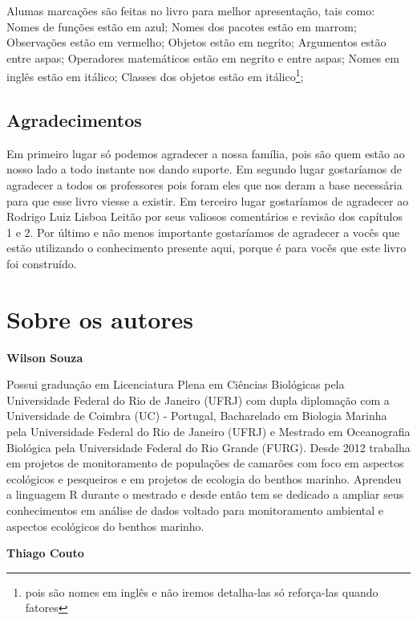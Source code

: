 \documentclass[14pt,titlepage, oneside, openany, a4paper]{book}
\begin{document}
Alumas marcações são feitas no livro para melhor apresentação, tais como: Nomes de funções estão em azul; Nomes dos pacotes estão em marrom; Observações estão em vermelho; Objetos estão em negrito; Argumentos estão entre aspas; Operadores matemáticos estão em negrito e entre aspas; Nomes em inglês estão em itálico; Classes dos objetos estão em itálico\footnote{pois são nomes em inglês e não iremos detalha-las só reforça-las quando fatores};

\hypertarget{agradecimentos}{%
\section*{Agradecimentos}\label{agradecimentos}}

Em primeiro lugar só podemos agradecer a nossa família, pois são quem estão ao nosso lado a todo instante nos dando suporte. Em segundo lugar gostaríamos de agradecer a todos os professores pois foram eles que nos deram a base necessária para que esse livro viesse a existir. Em terceiro lugar gostaríamos de agradecer ao Rodrigo Luiz Lisboa Leitão por seus valiosos comentários e revisão dos capítulos 1 e 2. Por último e não menos importante gostaríamos de agradecer a vocês que estão utilizando o conhecimento presente aqui, porque é para vocês que este livro foi construído.

\hypertarget{sobre-os-autores}{%
\chapter*{Sobre os autores}\label{sobre-os-autores}}

\textbf{Wilson Souza}

Possui graduação em Licenciatura Plena em Ciências Biológicas pela Universidade Federal do Rio de Janeiro (UFRJ) com dupla diplomação com a Universidade de Coimbra (UC) - Portugal, Bacharelado em Biologia Marinha pela Universidade Federal do Rio de Janeiro (UFRJ) e Mestrado em Oceanografia Biológica pela Universidade Federal do Rio Grande (FURG). Desde 2012 trabalha em projetos de monitoramento de populações de camarões com foco em aspectos ecológicos e pesqueiros e em projetos de ecologia do benthos marinho. Aprendeu a linguagem R durante o mestrado e desde então tem se dedicado a ampliar seus conhecimentos em análise de dados voltado para monitoramento ambiental e aspectos ecológicos do benthos marinho.

\textbf{Thiago Couto}
\end{document}

